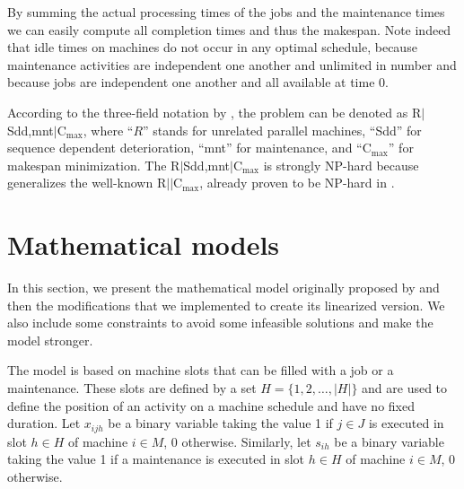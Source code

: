 \documentclass[a4paper,11pt]{article}
\begin{document}
By summing the actual processing times of the jobs and the maintenance times we can easily compute all completion times and thus the makespan. Note indeed that idle times on machines do not occur in any optimal schedule, because maintenance activities are independent one another and unlimited in number and  because jobs are independent one another and all available at time 0. 

According to the three-field notation by \cite{GLLR79}, the problem can be denoted as R$|$Sdd,mnt$|$C$_{\max}$, where ``$R$'' stands for unrelated parallel machines, ``Sdd'' for sequence dependent deterioration, ``mnt'' for maintenance, and ``C$_{\max}$'' for makespan minimization. The R$|$Sdd,mnt$|$C$_{\max}$ is strongly NP-hard because generalizes the well-known R$|$$|$C$_{\max}$, already proven to be NP-hard in \cite{P16}.
\section{Mathematical models} \label{sec:model}
%
In this section, we present the mathematical model originally proposed by \citep{ruiz2017makespan} and then the modifications that we implemented to create its linearized version. We also include some constraints to avoid some infeasible solutions and make the model stronger.

The model is based on machine slots that can be filled with a job or a maintenance. These slots are defined by a set $H = \{1, 2, \dots, |H|\}$ and are used to define the position of an activity on a machine schedule and have no fixed duration. 
Let $x_{ijh}$ be a binary variable taking the value 1 if $j \in J$ is executed in slot $h \in H$ of machine $i \in M$, 0 otherwise. Similarly, let $s_{ih}$ be a binary variable taking the value 1 if a maintenance is executed in slot $h \in H$ of machine $i \in M$, 0 otherwise. 
\end{document}
